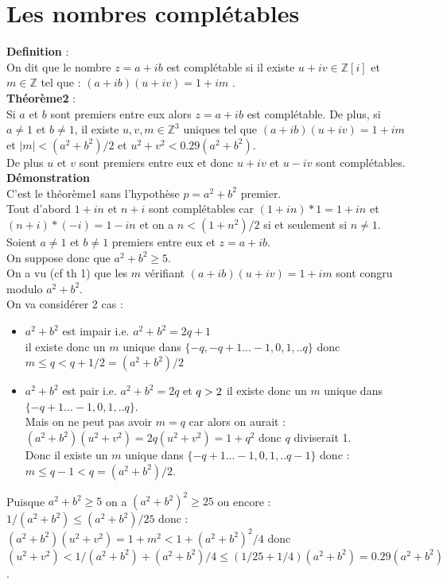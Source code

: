 \documentclass[a4paper,11pt]{book}
\newcommand{\Z}{{\mathbb{Z}}}
\begin{document}
\section{Les nombres compl\'etables}
{\bf Definition} :\\
On dit que le nombre $z=a+ib$ est compl\'etable si il existe $u+iv \in \Z[i]$ 
 et $m\in \Z$ tel que : $(a+ib)(u+iv)=1+im$ .\\
{\bf Th\'eor\`eme2} :\\
Si $a$ et $b$ sont premiers entre eux alors $z=a+ib$ est compl\'etable.
De plus,  si $a\neq 1$ et $b\neq 1$, il existe $u,v,m \in \Z^3$  uniques tel 
que $(a+ib)(u+iv)=1+im$ et $|m|<(a^2+b^2)/2$ et $u^2+v^2<0.29(a^2+b^2)$.\\
De plus $u$ et $v$ sont premiers entre eux et donc $u+iv$ et $u-iv$ sont
compl\'etables.\\
{\bf D\'emonstration}\\
C'est le th\'eor\`eme1 sans l'hypoth\`ese $p=a^2+b^2$ premier.\\
Tout d'abord $1+in$ et $n+i$ sont compl\'etables car $(1+in)*1=1+in$ et 
$(n+i)*(-i)=1-in$ et on a $n<(1+n^2)/2$ si et seulement si $n\neq 1$.\\
Soient $a\neq 1$ et $b\neq 1$ premiers entre eux et $z=a+ib$.\\
On suppose donc que $a^2+b^2\geq 5$.\\
On a vu (cf th 1) que les $m$ v\'erifiant $(a+ib)(u+iv)=1+im$ sont congru 
modulo $a^2+b^2$.\\
On va consid\'erer 2 cas :
\begin{itemize}
\item $a^2+b^2$ est impair i.e. $a^2+b^2=2q+1$\\
il existe donc un $m$ unique dans $\{-q,-q+1...-1,0,1,..q\}$ donc\\
$m\leq q<q+1/2=(a^2+b^2)/2$
\item $a^2+b^2$ est pair i.e. $a^2+b^2=2q$ et $q>2\\$
il existe donc un $m$ unique dans $\{-q+1...-1,0,1,..q\}$.\\
Mais on ne peut pas avoir $m=q$ car alors  on aurait :\\
$(a^2+b^2)(u^2+v^2)=2q(u^2+v^2)=1+q^2$ donc $q$ diviserait 1.\\
Donc il existe un $m$ unique dans $\{-q+1...-1,0,1,..q-1\}$ donc :\\
$m\leq q-1<q=(a^2+b^2)/2$.
\end{itemize}
Puisque $a^2+b^2\geq 5$ on a $(a^2+b^2)^2\geq 25$ ou encore :\\
$1/(a^2+b^2)\leq (a^2+b^2)/25$ donc :\\
$(a^2+b^2)(u^2+v^2)=1+m^2<1+(a^2+b^2)^2/4$ donc \\
$(u^2+v^2)< 1/(a^2+b^2)+(a^2+b^2)/4\leq (1/25+1/4)(a^2+b^2)=0.29(a^2+b^2)$.\\
\end{document}
